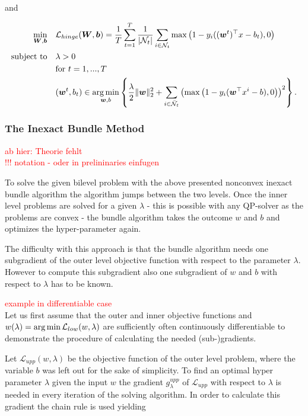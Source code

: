 and 

\begin{align}
\begin{split}
	\min_{\bm{W},\bm{b}} \quad &  \mathcal{L}_{hinge}(\bm{W},\bm{b}) = \frac{1}{T}\sum_{t=1}^T\frac{1}{|\mathcal{N}_t|}\sum_{i \in \mathcal{N}_t}{\max\left(1-y_i((\bm{w}^t)^{\top}x-b_t),0\right)}\\
	\text{subject to} \quad & \lambda > 0 \\
	& \text{for } t = 1,...,T \\
	& (\bm{w}^t,b_t) \in \operatorname*{arg\,min}_{\bm{w},b}\left\{ \frac{\lambda}{2} \|\bm{w}\|^2_2+\sum_{i\in \bar{\mathcal{N}}_t}{\left(\max\left(1-y_i(\bm{w}^{\top}x^i-b),0\right)\right)^2}\right\}. \\
\end{split}
\label{model_2}
\end{align}


\subsubsection{The Inexact Bundle Method}

\textcolor{red}{ab hier: Theorie fehlt\\
!!! notation - oder in prelininaries einfugen}

To solve the given bilevel problem with the above presented nonconvex inexact bundle algorithm the algorithm jumps between the two levels. Once the inner level problems are solved for a given \(\lambda\) - this is possible with any QP-solver as the problems are convex - the bundle algorithm takes the outcome \(w\) and \(b\) and optimizes the hyper-parameter again.

The difficulty with this approach is that the bundle algorithm needs one subgradient of the outer level objective function with respect to the parameter \(\lambda\). However to compute this subgradient also one subgradient of \(w\) and \(b\) with respect to \(\lambda\) has to be known.

\textcolor{red}{example in differentiable case}\\
Let us first assume that the outer and inner objective functions and \(w(\lambda)= \operatorname*{arg\,min} \mathcal{L}_{low}(w,\lambda)\) are sufficiently often continuously differentiable to demonstrate the procedure of calculating the needed {(sub-)gradients}.

Let \(\mathcal{L}_{upp}(w,\lambda)\) be the objective function of the outer level problem, where the variable \(b\) was left out for the sake of simplicity.
To find an optimal hyper parameter \(\lambda\) given the input \(w\) the gradient \(g^{upp}_{\lambda}\) of \(\mathcal{L}_{upp}\) with respect to \(\lambda\) is needed in every iteration of the solving algorithm.
In order to calculate this gradient the chain rule is used yielding

